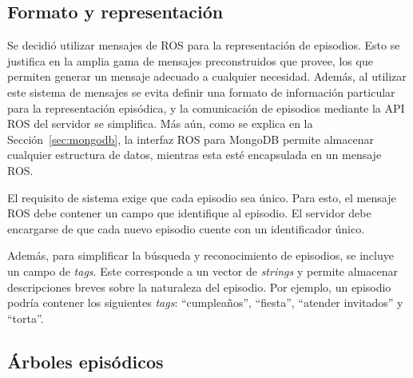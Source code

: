 \subsection{Formato y representación}

Se decidió utilizar mensajes de ROS para la representación de episodios. Esto se justifica en la amplia gama de mensajes preconstruidos que provee, los que permiten generar un mensaje adecuado a cualquier necesidad. Además, al utilizar este sistema de mensajes se evita definir una formato de información particular para la representación episódica, y la comunicación de episodios mediante la API ROS del servidor se simplifica. Más aún, como se explica en la Sección~\ref{sec:mongodb}, la interfaz ROS para MongoDB permite almacenar cualquier estructura de datos, mientras esta esté encapsulada en un mensaje ROS.

El requisito de sistema  exige que cada episodio sea único. Para esto, el mensaje ROS debe contener un campo que identifique al episodio. El servidor debe encargarse de que cada nuevo episodio cuente con un identificador único.

Además, para simplificar la búsqueda y reconocimiento de episodios, se incluye un campo de \textit{tags}. Este corresponde a un vector de \textit{strings} y permite almacenar descripciones breves sobre la naturaleza del episodio. Por ejemplo, un episodio podría contener los siguientes \textit{tags}: ``cumpleaños'', ``fiesta'', ``atender invitados'' y ``torta''.

 
\subsection{Árboles episódicos}

